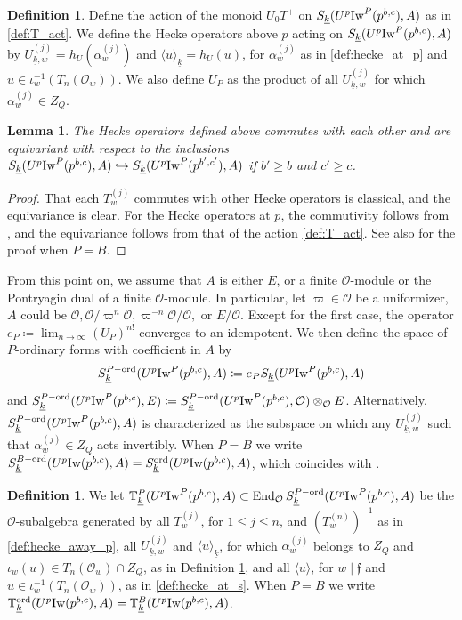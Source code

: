 \documentclass[leqno]{amsart}
\newtheorem{lem}[thm]{Lemma}
\theoremstyle{definition}
\newtheorem{defn}[thm]{Definition}
\theoremstyle{remark}
\newcommand{\oo}{\mathcal{O}}
\DeclareMathOperator{\End}{End}
\newcommand{\ff}{\mathfrak{f}}
\newcommand{\wt}[1]{\underline{ #1 }}
\newcommand{\Iw}{\textnormal{Iw}} %
\newcommand{\TT}{\mathbb{T}} %
\newcommand{\ord}{\textnormal{ord}} %
\begin{document}
\begin{defn}\label{def:hecke}
Define the action of the monoid $U_0T^+$ 
on $S_{\wt{k}}(U^p\Iw^P(p^{b,c}),A)$ as in \eqref{def:T_act}.
We define the Hecke operators above $p$ acting on 
$S_{\wt{k}}(U^p\Iw^P(p^{b,c}),A)$ by
$U_{\wt{k},w}^{(j)}=h_U(\alpha_w^{(j)})$
and $\langle u\rangle_{\wt{k}}=h_U(u)$,
for $\alpha_w^{(j)}$ as in \eqref{def:hecke_at_p}
and $u\in \iota_w^{-1}(T_n(\oo_w))$.
We also define $U_P$
as the product of all $U_{\wt{k},w}^{(j)}$
for which $\alpha_w^{(j)}\in Z_Q$.
\end{defn}


\begin{lem}
The Hecke operators defined above commutes with each other
and are equivariant with respect to the inclusions
$ S_{\wt{k}}(U^p\Iw^P(p^{b,c}),A)\hookrightarrow
S_{\wt{k}}(U^p\Iw^P(p^{b',c'}),A)$
if $b'\geq b$ and $c'\geq c$.
\end{lem}
\begin{proof}
That each $T_w^{(j)}$ commutes with other Hecke operators is classical,
and the equivariance is clear.
For the Hecke operators at $p$,
the commutivity follows from \cite[Lem 3.1.4]{emeI},
and the equivariance follows from 
that of the action \eqref{def:T_act}.
See also \cite[Lem 2.10]{ger} for the proof when $P=B$.
\end{proof}

From this point on,
we assume that $A$ is either $E$, or a finite $\oo$-module
or the Pontryagin dual of a finite $\oo$-module.
In particular, let $\varpi\in \oo$ be a uniformizer, $A$ could be 
$\oo, \oo/\varpi^n\oo, \varpi^{-n}\oo/\oo,$ or $E/\oo$.
Except for the first case,
the operator $e_P\coloneqq\lim_{n\to \infty}(U_P)^{n!}$
converges to an idempotent.
We then define the space of $P$-ordinary forms 
with coefficient in $A$ by
\[
	S_{\wt{k}}^{P-\ord}(U^p\Iw^P(p^{b,c}),A)\coloneqq
	e_PS_{\wt{k}}(U^p\Iw^P(p^{b,c}),A)
\]
and $S_{\wt{k}}^{P-\ord}(U^p\Iw^P(p^{b,c}),E)\coloneqq 
S_{\wt{k}}^{P-\ord}(U^p\Iw^P(p^{b,c}),\oo)\otimes_{\oo}E$.
Alternatively,
$S_{\wt{k}}^{P-\ord}(U^p\Iw^P(p^{b,c}),A)$
is characterized as the subspace on which 
any  $U_{\wt{k},w}^{(j)}$ such that 
$\alpha_w^{(j)}\in Z_Q$ acts invertibly.
When $P=B$ we write 
$S_{\wt{k}}^{B-\ord}(U^p\Iw(p^{b,c}),A)=
S_{\wt{k}}^{\ord}(U^p\Iw(p^{b,c}),A)$,
which coincides with \cite[Def 2.13]{ger}.

\begin{defn}\label{def:ord_hecke}
	We let $\TT^P_{\wt{k}}(U^p\Iw^P(p^{b,c}),A)\subset 
    \End_{\oo}S_{\wt{k}}^{P-\ord}(U^p\Iw^P(p^{b,c}),A)$
	be the $\oo$-subalgebra
	generated by all
	$T_w^{(j)}$, for $1\leq j\leq n$,
	and $(T_w^{(n)})^{-1}$ as in \eqref{def:hecke_away_p},
	all $U_{\wt{k},w}^{(j)}$ and $\langle u\rangle_{\wt{k}}$,
	for which $\alpha_w^{(j)}$ belongs to $Z_Q$
    and $\iota_w(u)\in T_n(\oo_w)\cap Z_Q$,
    as in Definition \ref{def:hecke},
    and all $\langle u\rangle$,
    for $w\mid \ff$ and $u\in \iota_w^{-1}(T_n(\oo_w))$,
    as in \eqref{def:hecke_at_s}.
    When $P=B$
    we write $\TT^{\ord}_{\wt{k}}(U^p\Iw(p^{b,c}),A)=
    \TT^B_{\wt{k}}(U^p\Iw(p^{b,c}),A)$.
\end{defn}
\end{document}
